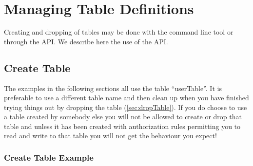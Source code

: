 \section{Managing Table Definitions}

Creating and dropping of tables may be done with the command line
tool or through the API. We describe here the use of the API.

\subsection{Create Table}
The examples in the following sections all use the table
``userTable''. It is preferable to use a different table name and then
clean up when you have finished trying things out by dropping the
table (\ref{sec:dropTable}). If you do choose to use a
table created by somebody else you will not be allowed to create or
drop that table and unless it has been created with authorization
rules permitting you to read and write to that table you will not get
the behaviour you expect!

\subsubsection{Create Table Example}
